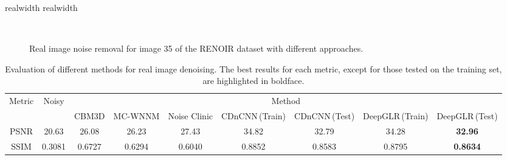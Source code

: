 \documentclass[10pt,twocolumn,letterpaper]{article}
\newcommand{\deflen}[2]{%
    \expandafter\newlength\csname #1\endcsname
    \expandafter\setlength\csname #1\endcsname{#2}%
}
\begin{document}
\deflen{realwidth}{85pt}
\begin{figure*}
\centering
        \hspace{\gauinter}
        \hspace{\gauinter}
        \hspace{\gauinter}
        \hspace{\gauinter}
        \\
        \hspace{\gauinter}
        \hspace{\gauinter}
        \hspace{\gauinter}
        \hspace{\gauinter}
 \caption{Real image noise removal for image 35 of the RENOIR dataset with different approaches.}
 \label{fig:renoir35}
\end{figure*}
\begin{table*}
  \centering
  \caption{Evaluation of different methods for real image denoising. The best results for each metric, except for those tested on the training set, are highlighted in boldface.}
  \footnotesize
    \begin{tabular}{c||c||c|c|c|c|c|c|c}
    \hline
    \multicolumn{1}{c||}{\multirow{2}[4]{*}{Metric}} & \multirow{2}[4]{*}{Noisy} & \multicolumn{7}{c}{Method} \\
\cline{3-9}    \multicolumn{1}{c||}{} &       & CBM3D & MC-WNNM & Noise Clinic & \multicolumn{1}{p{7.21em}|}{CDnCNN\,(Train)} & \multicolumn{1}{p{7.165em}|}{CDnCNN\,(Test)} & \multicolumn{1}{p{7.21em}|}{DeepGLR\,(Train)} & \multicolumn{1}{p{7.375em}}{DeepGLR\,(Test)} \\
    \hline
    \hline
    PSNR  & 20.63 & 26.08 & 26.23 & 27.43 & 34.82 & 32.79 & 34.28 & \textbf{32.96} \\
    \hline
    SSIM  & 0.3081 & 0.6727 & 0.6294 & 0.6040 & 0.8852 & 0.8583 & 0.8795 & \textbf{0.8634} \\
    \hline
    \end{tabular}%
  \label{tab:renoir_comp}%
\end{table*}%
\end{document}
